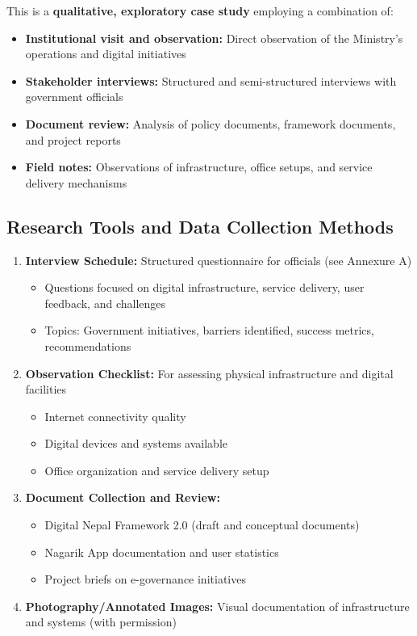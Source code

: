 \documentclass[12pt,a4paper]{article}
\begin{document}
This is a \textbf{qualitative, exploratory case study} employing a combination of:
\begin{itemize}
    \item \textbf{Institutional visit and observation:} Direct observation of the Ministry's operations and digital initiatives
    \item \textbf{Stakeholder interviews:} Structured and semi-structured interviews with government officials
    \item \textbf{Document review:} Analysis of policy documents, framework documents, and project reports
    \item \textbf{Field notes:} Observations of infrastructure, office setups, and service delivery mechanisms
\end{itemize}

\subsection{Research Tools and Data Collection Methods}

\begin{enumerate}
    \item \textbf{Interview Schedule:} Structured questionnaire for officials (see Annexure A)
    \begin{itemize}
        \item Questions focused on digital infrastructure, service delivery, user feedback, and challenges
        \item Topics: Government initiatives, barriers identified, success metrics, recommendations
    \end{itemize}
    
    \item \textbf{Observation Checklist:} For assessing physical infrastructure and digital facilities
    \begin{itemize}
        \item Internet connectivity quality
        \item Digital devices and systems available
        \item Office organization and service delivery setup
    \end{itemize}
    
    \item \textbf{Document Collection and Review:}
    \begin{itemize}
        \item Digital Nepal Framework 2.0 (draft and conceptual documents)
        \item Nagarik App documentation and user statistics
        \item Project briefs on e-governance initiatives
    \end{itemize}
    
    \item \textbf{Photography/Annotated Images:} Visual documentation of infrastructure and systems (with permission)
\end{enumerate}
\end{document}
